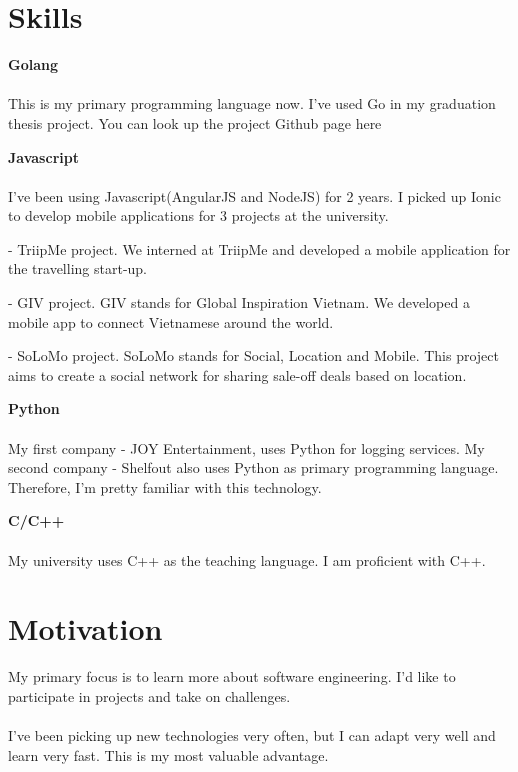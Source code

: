 \documentclass[letterpaper]{article}
\renewenvironment{itemize}{
  \begin{list}{}{
    \setlength{\leftmargin}{1.5em}
  }
}{
  \end{list}
}
\begin{document}
\section*{Skills}
\begin{itemize}
\item {\bf Golang}
\\
\\
This is my primary programming language now. I've used Go in my graduation thesis project. You can look up the project Github page here \cite{thesis}
\item {\bf Javascript}
\\
\\
I've been using Javascript(AngularJS and NodeJS) for 2 years. I picked up Ionic to develop mobile applications for 3 projects at the university.
\begin{itemize}
\item{- TriipMe project. We interned at TriipMe and developed a mobile application for the travelling start-up.}
\item{ - GIV project. GIV stands for Global Inspiration Vietnam. We developed a mobile app to connect Vietnamese around the world. }
\item{ - SoLoMo project. SoLoMo stands for Social, Location and Mobile. This project aims to create a social network for sharing sale-off deals based on location.}
\end{itemize}
\item{\bf Python}
\\
\\
My first company - JOY Entertainment, uses Python for logging services. My second company - Shelfout also uses Python as primary programming language. Therefore, I'm pretty familiar with this technology.
\item{\bf C/C++}
\\
\\
My university uses C++ as the teaching language. I am proficient with C++.
\end{itemize}

\section*{Motivation}
My primary focus is to learn more about software engineering. I'd like to participate in projects and take on challenges. 
\\
\\
I've been picking up new technologies very often, but I can adapt very well and learn very fast. This is my most valuable advantage.
\end{document}
